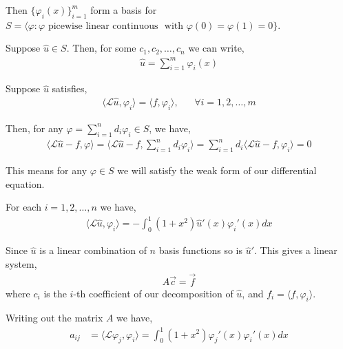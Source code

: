 \documentclass[10pt]{article}
\begin{document}
\begin{solution}[Solution]
\begin{enumerate}
        Then \( \{ \varphi_i(x)\}_{i=1}^{m} \) form a basis for \( S = \langle\varphi : \varphi \text{ picewise linear continuous } \text{ with }\varphi(0) = \varphi(1) = 0  \} \).        

        Suppose \( \hat{u}\in S \). Then, for some \( c_1, c_2, \ldots, c_n\) we can write,
        \begin{align*}
            \hat{u} = \sum_{i=1}^{m}\varphi_i(x)
        \end{align*}
        
        Suppose \( \hat{u} \) satisfies,
        \begin{align*}
            \langle \mathcal{L} \hat{u}, \varphi_i \rangle = \langle f, \varphi_i \rangle, && \forall i=1,2,\ldots,m
        \end{align*}
        
        Then, for any \( \varphi = \sum_{i=1}^{n}d_i \varphi_i \in S \), we have,
        \begin{align*}
            \langle \mathcal{L} \hat{u} - f, \varphi \rangle  = \langle \mathcal{L}\hat{u} -f , \sum_{i=1}^{n}d_i\varphi_i \rangle = 
            \sum_{i=1}^{n}d_i\langle \mathcal{L} \hat{u} -f , \varphi_i\rangle = 0
        \end{align*}
        
        This means for any \( \varphi\in S \) we will satisfy the weak form of our differential equation.

        For each \( i=1,2,\ldots, n \) we have,
        \begin{align*}
            \langle \mathcal{L} \hat{u}, \varphi_i\rangle = -\int_{0}^{1}(1+x^2)\hat{u}'(x)\varphi_i'(x)dx
        \end{align*}
        
        Since \( \hat{u} \) is a linear combination of \( n \) basis functions so is \( \hat{u}' \). This gives a linear system,
        \begin{align*}
            A\vec{c} = \vec{f}
        \end{align*}
        where \( c_i \) is the \( i \)-th coefficient of our decomposition of \( \hat{u} \), and \( f_i = \langle f, \varphi_i \rangle
        \).


        Writing out the matrix \( A \) we have,
        \begin{align*}
            a_{ij} &= \langle \mathcal{L}\varphi_j, \varphi_i\rangle 
            = \int_{0}^{1}(1+x^2)\varphi_j'(x)\varphi_i'(x)dx 
        \end{align*}
        

\end{enumerate}
\end{solution}
\end{document}
